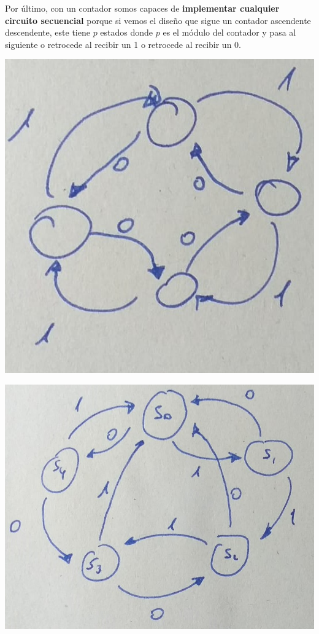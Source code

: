 \documentclass[a4paper,10pt]{book}
\begin{document}
Por último, con un contador somos capaces de \textbf{implementar cualquier circuito secuencial} porque si vemos el diseño que sigue un contador ascendente descendente, este tiene $p$ estados donde $p$ es el módulo del contador y pasa al siguiente o retrocede al recibir un 1 o retrocede al recibir un 0.

\begin{multicols}{2}
\begin{center}
\includegraphics[scale=0.3]{sistema1}
\end{center}

\begin{center}
\includegraphics[scale=0.25]{sistema2}
\end{center}
\end{multicols}
\end{document}

